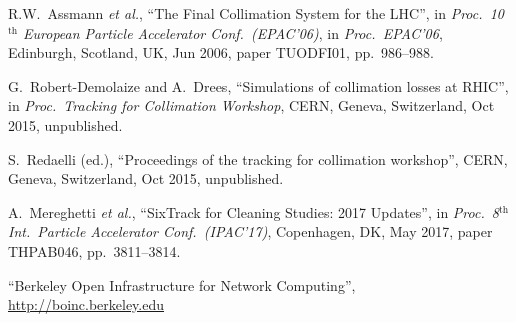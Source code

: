 \begin{thebibliography}{99}
  R.W.~Assmann \emph{et al.},
  ``The Final Collimation System for the LHC'',
  in \emph{Proc.~10$^{\textrm{th}}$ European Particle Accelerator Conf.~(EPAC'06)},
  in \emph{Proc.~EPAC'06},
  Edinburgh, Scotland, UK, Jun 2006, paper TUODFI01,
  pp.~986--988.
  
  G.~Robert-Demolaize and A.~Drees, ``Simulations of collimation
  losses at RHIC'', in \emph{Proc.~Tracking for Collimation Workshop},
  CERN, Geneva, Switzerland, Oct 2015, unpublished.

  S.~Redaelli (ed.), ``Proceedings of the tracking for collimation
  workshop'', CERN, Geneva, Switzerland, Oct 2015, unpublished.

  A.~Mereghetti \emph{et al.},
  ``SixTrack for Cleaning Studies: 2017 Updates'',
  in \emph{Proc.~8$^{\textrm{th}}$ Int.~Particle Accelerator Conf.~(IPAC'17)},
  Copenhagen, DK, May 2017, paper THPAB046, 
  pp.~3811--3814.
  
 ``Berkeley Open Infrastructure for Network Computing'',
  \url{http://boinc.berkeley.edu}
  
\end{thebibliography}

